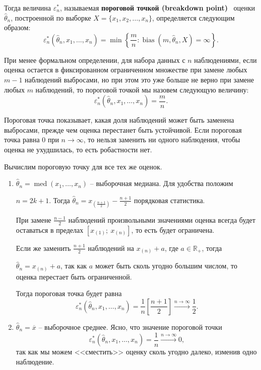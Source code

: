 \documentclass[specialist,
substylefile = spbu.rtx,
               subf,href,colorlinks=true, 12pt]{disser}
\DeclareMathOperator*{\med}{med}
\begin{document}
Тогда величина $\varepsilon^*_n$, называемая  \textbf{пороговой точкой (breakdown point)}~\cite{Diakonikolas} оценки $\widehat {\theta}_n$, построенной по выборке $X=\{x_1, x_2,\ldots, x_n\}$, определяется следующим образом:  
\begin{equation}
\varepsilon_n^*(\widehat {\theta}_n, x_1,\ldots, x_n)=\min \left\{\frac{m}{n}: \operatorname{bias}\left(m, \widehat {\theta}_n, X\right)=\infty\right\}.
\label{eq:b_point}
\end{equation}

При менее формальном определении, для набора данных с $n$ наблюдениями, если оценка остается в фиксированном ограниченном множестве при замене любых $m-1$ наблюдений выбросами, но при этом это уже больше не верно при замене любых $m$ наблюдений, то пороговой точкой мы назовем следующую величину:
\begin{equation}
\varepsilon_n^*(\widehat {\theta}_n, x_1,\ldots, x_n)=\frac{m}{n}.
\label{eq:b_point_1}
\end{equation}

Пороговая точка показывает, какая доля наблюдений может быть заменена выбросами, прежде чем оценка перестанет быть устойчивой. Если пороговая точка равна 0 при $n\to \infty$, то нельзя заменить ни одного наблюдения, чтобы оценка не ухудшилась, то есть робастности нет.

Вычислим пороговую точку для все тех же оценок. 
\begin{enumerate}
     \item $\widehat {\theta}_n=\med(x_1,\ldots,x_n)$ -- выборочная медиана. Для удобства положим 
     
     $n=2k+1$. Тогда $\widehat {\theta}_n=x_{(\frac{n+1}{2})}-\frac{n+1}{2}$ порядковая статистика.
      
      При замене $\frac{n-1}{2}$ наблюдений произвольными значениями оценка всегда будет оставаться в пределах $[x_{(1)};\  x_{(n)}]$, то есть будет ограничена. 
     
      Если же заменить $\frac{n+1}{2}$ наблюдений на $x_{(n)}+a$, где $a\in \mathbb{R}_+$, тогда 
      
      $\widehat{\theta}_n=x_{(n)}+a$, так как $a$ может быть сколь угодно большим числом, то оценка перестает быть ограниченной. 
      
      Тогда пороговая точка будет равна
      \[\varepsilon_n^*(\widehat {\theta}_n, x_1,\ldots, x_n)=\frac{1}{n}\left[\frac{n+1}{2}\right]\xrightarrow{n\to\infty} \frac{1}{2}.\]

          \item $\widehat {\theta}_n=\overline{x}$ -- выборочное среднее. Ясно, что значение пороговой точки 
    \[\varepsilon_n^*(\widehat {\theta}_n, x_1,\ldots, x_n)=\frac{1}{n}\xrightarrow{n\to\infty} 0,\]
     так как мы можем <<сместить>> оценку сколь угодно далеко, изменив одно наблюдение.
     
\end{enumerate}
\end{document}

